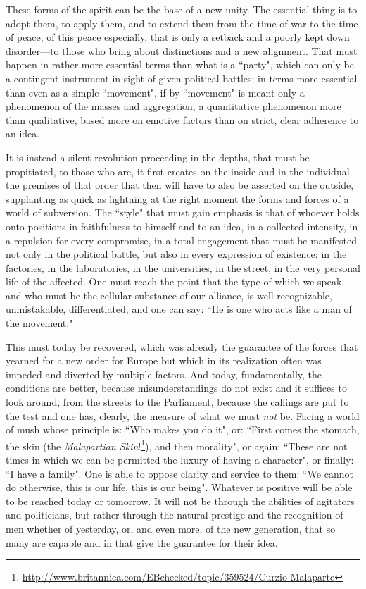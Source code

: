These forms of the spirit can be the base of a new unity. The essential thing is to adopt them, to apply them, and to extend them from the time of war to the time of peace, of this peace especially, that is only a setback and a poorly kept down disorder—to those who bring about distinctions and a new alignment. That must happen in rather more essential terms than what is a ``party", which can only be a contingent instrument in sight of given political battles; in terms more essential than even as a simple ``movement", if by ``movement" is meant only a phenomenon of the masses and aggregation, a quantitative phenomenon more than qualitative, based more on emotive factors than on strict, clear adherence to an idea.

It is instead a silent revolution proceeding in the depths, that must be propitiated, to those who are, it first creates on the inside and in the individual the premises of that order that then will have to also be asserted on the outside, supplanting as quick as lightning at the right moment the forms and forces of a world of subversion. The ``style" that must gain emphasis is that of whoever holds onto positions in faithfulness to himself and to an idea, in a collected intensity, in a repulsion for every compromise, in a total engagement that must be manifested not only in the political battle, but also in every expression of existence: in the factories, in the laboratories, in the universities, in the street, in the very personal life of the affected. One must reach the point that the type of which we speak, and who must be the cellular substance of our alliance, is well recognizable, unmistakable, differentiated, and one can say: ``He is one who acts like a man of the movement."

This must today be recovered, which was already the guarantee of the forces that yearned for a new order for Europe but which in its realization often was impeded and diverted by multiple factors. And today, fundamentally, the conditions are better, because misunderstandings do not exist and it suffices to look around, from the streets to the Parliament, because the callings are put to the test and one has, clearly, the measure of what we must \emph{not} be. Facing a world of mush whose principle is: ``Who makes you do it", or: ``First comes the stomach, the skin (the \emph{Malapartian Skin}!\footnote{\url{http://www.britannica.com/EBchecked/topic/359524/Curzio-Malaparte}}), and then morality", or again: ``These are not times in which we can be permitted the luxury of having a character", or finally: ``I have a family". One is able to oppose clarity and service to them: ``We cannot do otherwise, this is our life, this is our being". Whatever is positive will be able to be reached today or tomorrow. It will not be through the abilities of agitators and politicians, but rather through the natural prestige and the recognition of men whether of yesterday, or, and even more, of the new generation, that so many are capable and in that give the guarantee for their idea.

